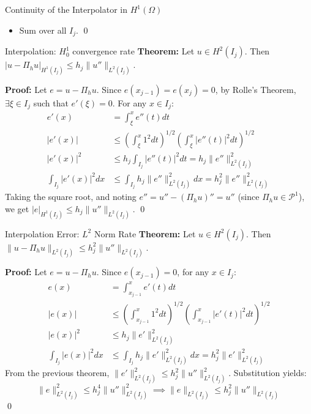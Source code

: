 \documentclass[aspectratio=169]{beamer}
\begin{document}
\begin{frame}[t]{Continuity of the Interpolator in $H^1(\Omega)$}
\begin{itemize}
                \item<3-> Sum over all $I_j$. \qed
        \end{itemize}
\end{frame}
\begin{frame}{Interpolation: $H_0^1$ convergence rate}
    \textbf{Theorem:} Let $u \in H^2(I_j)$. Then $|u - \Pi_h u|_{H^1(I_j)} \leq h_j \|u''\|_{L^2(I_j)}$. \pause

    \textbf{Proof:} Let $e = u - \Pi_h u$. Since $e(x_{j-1}) = e(x_j) = 0$, by Rolle's Theorem, $\exists \xi \in I_j$ such that $e'(\xi) = 0$. For any $x \in I_j$:
    \begin{align*}
        e'(x) &= \int_\xi^x e''(t) dt \tag{Fund. Thm. of Calculus} \\
        |e'(x)| &\leq \left( \int_\xi^x 1^2 dt \right)^{1/2} \left( \int_\xi^x |e''(t)|^2 dt \right)^{1/2} \tag{Cauchy-Schwarz} \\
        |e'(x)|^2 &\leq h_j \int_{I_j} |e''(t)|^2 dt = h_j \|e''\|_{L^2(I_j)}^2 \tag{Bounding integral domain} \\
        \int_{I_j} |e'(x)|^2 dx &\leq \int_{I_j} h_j \|e''\|_{L^2(I_j)}^2 dx = h_j^2 \|e''\|_{L^2(I_j)}^2 \tag{Integrate over $I_j$}
    \end{align*}
    Taking the square root, and noting $e'' = u'' - (\Pi_h u)'' = u''$ (since $\Pi_h u \in \mathcal{P}^1$), we get $|e|_{H^1(I_j)} \leq h_j \|u''\|_{L^2(I_j)}$. \qed
\end{frame}

\begin{frame}{Interpolation Error: $L^2$ Norm Rate}
    \textbf{Theorem:} Let $u \in H^2(I_j)$. Then $\|u - \Pi_h u\|_{L^2(I_j)} \leq h_j^2 \|u''\|_{L^2(I_j)}$.

    \textbf{Proof:} Let $e = u - \Pi_h u$. Since $e(x_{j-1}) = 0$, for any $x \in I_j$:
    \begin{align*}
        e(x) &= \int_{x_{j-1}}^x e'(t) dt \tag{Fund. Thm. of Calculus} \\
        |e(x)| &\leq \left( \int_{x_{j-1}}^x 1^2 dt \right)^{1/2} \left( \int_{x_{j-1}}^x |e'(t)|^2 dt \right)^{1/2} \tag{Cauchy-Schwarz} \\
        |e(x)|^2 &\leq h_j \|e'\|_{L^2(I_j)}^2 \tag{Bounding integral domain} \\
        \int_{I_j} |e(x)|^2 dx &\leq \int_{I_j} h_j \|e'\|_{L^2(I_j)}^2 dx = h_j^2 \|e'\|_{L^2(I_j)}^2 \tag{Integrate over $I_j$}
    \end{align*}
    From the previous theorem, $\|e'\|_{L^2(I_j)}^2 \leq h_j^2 \|u''\|_{L^2(I_j)}^2$. Substitution yields:
    $$ \|e\|_{L^2(I_j)}^2 \leq h_j^4 \|u''\|_{L^2(I_j)}^2 \implies \|e\|_{L^2(I_j)} \leq h_j^2 \|u''\|_{L^2(I_j)} $$ \qed
\end{frame}
\end{document}
